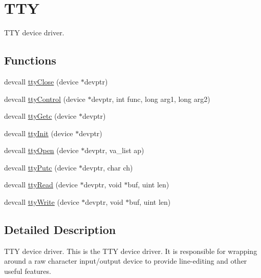 \hypertarget{group__tty}{\section{T\-T\-Y}
\label{group__tty}
}


T\-T\-Y device driver.  


\subsection*{Functions}
\begin{DoxyCompactItemize}
\item 
devcall \hyperlink{group__tty_gabf86c9bbae4a364609afd5ef956e85a4}{tty\-Close} (device $\ast$devptr)
\item 
devcall \hyperlink{group__tty_gae0e31c01429500c6299f417368ba62b8}{tty\-Control} (device $\ast$devptr, int func, long arg1, long arg2)
\item 
devcall \hyperlink{group__tty_ga47e9e2910ea6b118ff1537993e22fa83}{tty\-Getc} (device $\ast$devptr)
\item 
devcall \hyperlink{group__tty_ga8ab0537c72209e88cc3f75e430bdd5a8}{tty\-Init} (device $\ast$devptr)
\item 
devcall \hyperlink{group__tty_ga107c21ddcbf646b45da719997a92a34e}{tty\-Open} (device $\ast$devptr, va\-\_\-list ap)
\item 
devcall \hyperlink{group__tty_gac5f57186307659fac143ac33ec58f0ac}{tty\-Putc} (device $\ast$devptr, char ch)
\item 
devcall \hyperlink{group__tty_gada4e82772e7feab714f1bfe3a5cf013b}{tty\-Read} (device $\ast$devptr, void $\ast$buf, uint len)
\item 
devcall \hyperlink{group__tty_ga82e48cd04d4948c729b4a96e4e028bde}{tty\-Write} (device $\ast$devptr, void $\ast$buf, uint len)
\end{DoxyCompactItemize}


\subsection{Detailed Description}
T\-T\-Y device driver. This is the T\-T\-Y device driver. It is responsible for wrapping around a raw character input/output device to provide line-\/editing and other useful features. 

